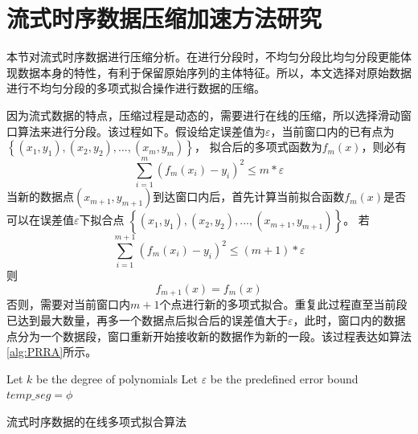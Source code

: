 \section{流式时序数据压缩加速方法研究}
本节对流式时序数据进行压缩分析。在进行分段时，不均匀分段比均匀分段更能体现数据本身的特性，有利于保留原始序列的主体特征。所以，本文选择对原始数据进行不均匀分段的多项式拟合操作进行数据的压缩。

因为流式数据的特点，压缩过程是动态的，需要进行在线的压缩，所以选择滑动窗口算法来进行分段。该过程如下。假设给定误差值为$\varepsilon $，当前窗口内的已有点为
$\left \{ \left ( x_{1},y_{1} \right ),\left ( x_{2},y_{2} \right ),...,\left ( x_{m},y_{m} \right ) \right \}$，
拟合后的多项式函数为$f_{m}\left ( x \right )$，则必有
\begin{equation}\sum_{i=1}^{m}\left ( f_{m}\left ( x_{i} \right )-y_{i} \right )^{2}\leq m*\varepsilon \end{equation}
当新的数据点$\left ( x_{m+1},y_{m+1} \right )$到达窗口内后，首先计算当前拟合函数$f_{m}\left ( x \right )$是否可以在误差值$\varepsilon $下拟合点
$\left \{ \left ( x_{1},y_{1} \right ),\left ( x_{2},y_{2} \right ),...,\left ( x_{m+1},y_{m+1} \right ) \right \}$。
若\begin{equation}\sum_{i=1}^{m+1}\left ( f_{m}\left ( x_{i} \right )-y_{i} \right )^{2}\leq (m+1)*\varepsilon \end{equation}
则\begin{equation}f_{m+1}\left ( x \right ) = f_{m}\left ( x \right )\end{equation}否则，需要对当前窗口内$m+1$个点进行新的多项式拟合。重复此过程直至当前段已达到最大数量，再多一个数据点后拟合后的误差值大于$\varepsilon $，此时，窗口内的数据点分为一个数据段，窗口重新开始接收新的数据作为新的一段。该过程表达如算法\ref{alg:PRRA}所示。

\begin{algorithm}
	
	
	
	Let $k$ be the degree of polynomials\;
	Let $\varepsilon$ be the predefined error bound\;
	$temp\_seg = \phi$\;
	\caption{流式时序数据的在线多项式拟合算法}
	\label{alg:PRRA}
\end{algorithm}

